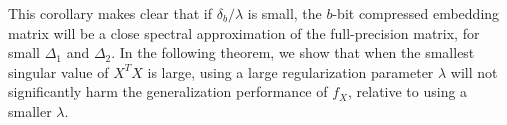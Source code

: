 
This corollary makes clear that if $\delta_b/\lambda$ is small, the $b$-bit compressed embedding matrix will be a close spectral approximation of the full-precision matrix, for small $\Delta_1$ and $\Delta_2$.
In the following theorem, we show that when the smallest singular value of $X^TX$ is large, using a large regularization parameter $\lambda$ will not significantly harm the generalization performance of $f_X$, relative to using a smaller $\lambda$.
%

